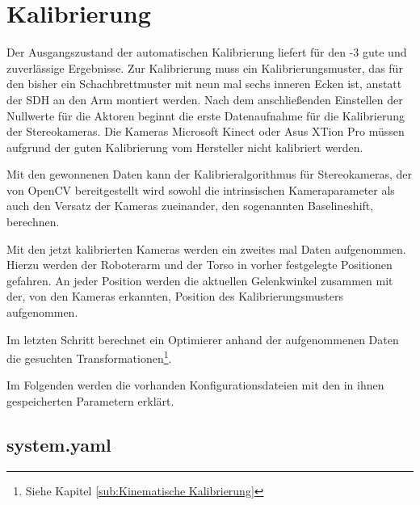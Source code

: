\section{Kalibrierung}

Der Ausgangszustand der automatischen Kalibrierung liefert für den -3
gute und zuverlässige Ergebnisse. Zur Kalibrierung muss ein
Kalibrierungsmuster, das für den \cob bisher ein Schachbrettmuster mit neun mal
sechs inneren Ecken \cite{opencv_chessboard} ist, anstatt der \ac{SDH} an
den Arm montiert werden. Nach dem anschließenden Einstellen der Nullwerte für
die Aktoren beginnt die erste Datenaufnahme für die Kalibrierung der
Stereokameras. Die Kameras Microsoft Kinect oder Asus XTion Pro müssen aufgrund der
guten Kalibrierung vom Hersteller nicht kalibriert werden. 

Mit den gewonnenen Daten kann der Kalibrieralgorithmus für Stereokameras,
der von OpenCV bereitgestellt wird sowohl die intrinsischen Kameraparameter als
auch den Versatz der Kameras zueinander, den sogenannten Baselineshift,
berechnen.

Mit den jetzt kalibrierten Kameras werden ein zweites mal Daten aufgenommen.
Hierzu werden der Roboterarm und der Torso in vorher festgelegte Positionen
gefahren. An jeder Position werden die aktuellen Gelenkwinkel zusammen mit der,
von den Kameras erkannten, Position des Kalibrierungsmusters aufgenommen.

Im letzten Schritt berechnet ein Optimierer anhand der aufgenommenen Daten die
gesuchten Transformationen\footnote{Siehe Kapitel 
  \ref{sub:Kinematische Kalibrierung}}.\cite{Haug2012}



Im Folgenden werden die vorhanden Konfigurationsdateien mit den in ihnen
gespeicherten Parametern erklärt.



\subsection{system.yaml}

